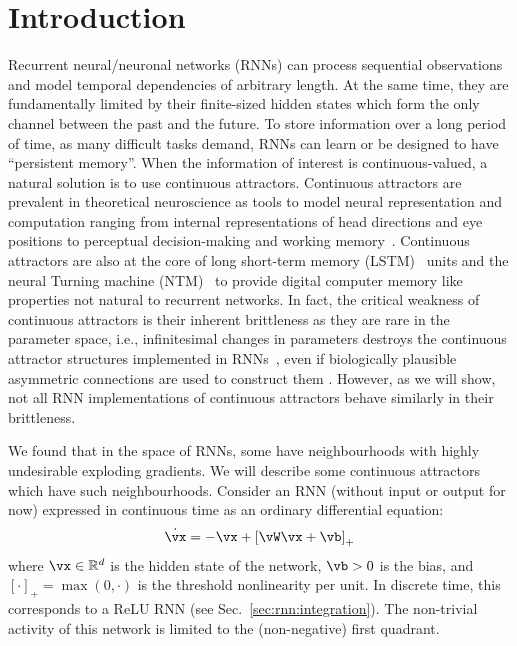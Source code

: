 \documentclass{article} %
\newcounter{ct}
\newcommand{\reals}{\mathbb{R}}
\theoremstyle{definition}
\theoremstyle{remark}
\renewcommand{\cite}{\citep}
\begin{document}
\section{Introduction}

Recurrent neural/neuronal networks (RNNs) can process sequential observations and model temporal dependencies of arbitrary length.
At the same time, they are fundamentally limited by their finite-sized hidden states which form the only channel between the past and the future.
To store information over a long period of time, as many difficult tasks demand, RNNs can learn or be designed to have ``persistent memory''.
When the information of interest is continuous-valued, a natural solution is to use continuous attractors.
Continuous attractors are prevalent in theoretical neuroscience as tools to model neural representation and computation ranging from internal representations of head directions and eye positions to perceptual decision-making and working memory~\cite{Khona2022}.
Continuous attractors are also at the core of long short-term memory (LSTM)~\cite{Greff2017} units and the neural Turning machine (NTM)~\cite{Graves2014} to provide digital computer memory like properties not natural to recurrent networks. %
In fact, the critical weakness of continuous attractors is their inherent brittleness as they are rare in the parameter space, i.e., infinitesimal changes in parameters destroys the continuous attractor structures implemented in RNNs~\cite{seung1996,Renart2003}, even if biologically plausible asymmetric connections are used to construct them \citep{darshan2022}.
However, as we will show, not all RNN implementations of continuous attractors behave similarly in their brittleness.

We found that in the space of RNNs, some have neighbourhoods with highly undesirable exploding gradients. We will describe some continuous attractors which have such neighbourhoods.
Consider an RNN (without input or output for now) expressed in continuous time as an ordinary differential equation:
\begin{align}\label{eq:TLN}
    \dot{\vx} = -\vx + \left[ \vW \vx + \vb \right]_{+}
\end{align}
where $\vx \in \reals^d$ is the hidden state of the network, $\vb > 0$ is the bias, and $[\cdot]_{+} = \max(0,\cdot)$ is the threshold nonlinearity per unit.
In discrete time, this corresponds to a ReLU RNN (see Sec.~\ref{sec:rnn:integration}).
The non-trivial activity of this network is limited to the (non-negative) first quadrant.
\end{document}
